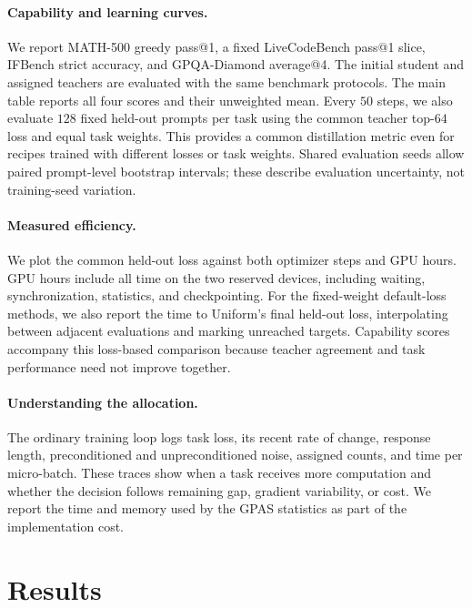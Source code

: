 \paragraph{Capability and learning curves.}
We report MATH-500 greedy pass@1, a fixed LiveCodeBench pass@1 slice,
IFBench strict accuracy, and GPQA-Diamond average@4. The initial student
and assigned teachers are evaluated with the same benchmark protocols.
The main table reports all four scores and their unweighted mean.
Every $50$ steps, we also evaluate $128$ fixed held-out prompts per task
using the common teacher top-$64$ loss and equal task weights.
This provides a common distillation metric even for recipes trained
with different losses or task weights. Shared evaluation seeds allow
paired prompt-level bootstrap intervals; these describe evaluation
uncertainty, not training-seed variation.

\paragraph{Measured efficiency.}
We plot the common held-out loss against both optimizer steps and
GPU hours. GPU hours include all time on the two reserved devices,
including waiting, synchronization, statistics, and checkpointing.
For the fixed-weight default-loss methods, we also report the time to
Uniform's final held-out loss, interpolating between adjacent evaluations
and marking unreached targets. Capability scores accompany this
loss-based comparison because teacher agreement and task performance
need not improve together.

\paragraph{Understanding the allocation.}
The ordinary training loop logs task loss, its recent rate of change,
response length, preconditioned and unpreconditioned noise, assigned
counts, and time per micro-batch. These traces show when a task receives
more computation and whether the decision follows remaining gap,
gradient variability, or cost. We report the time and memory used by
the GPAS statistics as part of the implementation cost.

\section{Results}
\label{sec:results}

